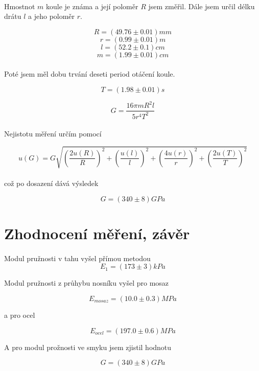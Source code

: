 \documentclass[a4paper,11pt]{article}
\begin{document}
        \paragraph{} Hmostnot $m$ koule je známa a její poloměr $R$ jsem změřil. Dále jsem určil 
            délku drátu $l$ a jeho poloměr $r$.

        $$ R = (49.76 \pm 0.01) mm $$
        $$ r = (0.99 \pm 0.01) m$$
        $$ l = (52.2 \pm 0.1) cm $$
        $$ m = (1.99 \pm 0.01) cm $$

        \paragraph{} Poté jsem měl dobu trvání deseti period otáčení koule.

        $$ T = (1.98 \pm 0.01) s $$

        \begin{equation}
            G = \frac{16 \pi m R^{2} l}{5 r^{4} T^{2}}
        \end{equation}

        \paragraph{} Nejistotu měření určím pomocí

        \begin{equation}
            u(G) = G \sqrt{\left( \frac{2 u(R)}{R} \right)^{2} + \left( \frac{u(l)}{l} \right)^{2} + \left( \frac{4 u(r)}{r} \right)^{2} 
                + \left( \frac{2 u(T)}{T} \right)^{2}}
        \end{equation}

        \paragraph{} což po dosazení dává výsledek

        $$G = (340 \pm 8) GPa$$

    \section{Zhodnocení měření, závěr}
        
        \paragraph{} Modul pružnosti v tahu vyšel přímou metodou
            $$E_{1} = (173 \pm 3) kPa$$

        Modul pružnosti z průhybu nosníku vyšel pro mosaz
            
            $$E_{mosaz} = (10.0 \pm 0.3) MPa$$

        a pro ocel

            $$E_{ocel} = (197.0 \pm 0.6) MPa$$

        A pro modul prožnosti ve smyku jsem zjistil hodnotu

            $$G = (340 \pm 8) GPa$$
\end{document}
